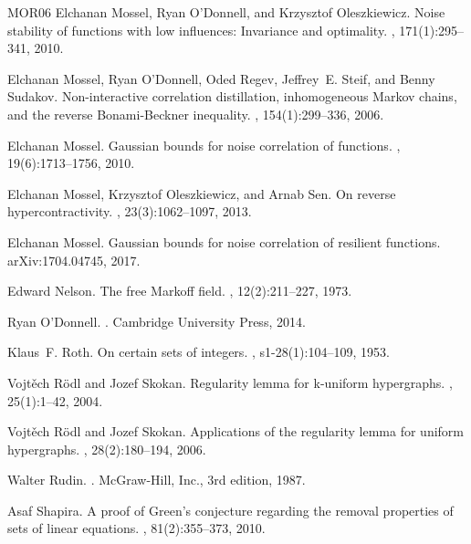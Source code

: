 \documentclass{daj}
\newcommand{\1}{\mathbbm{1}}
\theoremstyle{plain}
\theoremstyle{definition}
\begin{document}
\begin{thebibliography}{MOR{\etalchar{+}}06}
Elchanan Mossel, Ryan O'Donnell, and Krzysztof Oleszkiewicz.
\newblock Noise stability of functions with low influences: Invariance and
  optimality.
, 171(1):295--341, 2010.

Elchanan Mossel, Ryan O'Donnell, Oded Regev, Jeffrey~E. Steif, and Benny
  Sudakov.
\newblock Non-interactive correlation distillation, inhomogeneous {M}arkov
  chains, and the reverse {B}onami-{B}eckner inequality.
, 154(1):299--336, 2006.

Elchanan Mossel.
\newblock Gaussian bounds for noise correlation of functions.
, 19(6):1713--1756, 2010.

Elchanan Mossel, Krzysztof Oleszkiewicz, and Arnab Sen.
\newblock On reverse hypercontractivity.
, 23(3):1062--1097, 2013.

Elchanan Mossel.
\newblock Gaussian bounds for noise correlation of resilient functions.
\newblock arXiv:1704.04745, 2017.

Edward Nelson.
\newblock The free {M}arkoff field.
, 12(2):211--227, 1973.

Ryan {O'Donnell}.
.
\newblock Cambridge University Press, 2014.

Klaus~F. Roth.
\newblock On certain sets of integers.
, s1-28(1):104--109,
  1953.

Vojtěch Rödl and Jozef Skokan.
\newblock Regularity lemma for k-uniform hypergraphs.
, 25(1):1--42, 2004.

Vojtěch Rödl and Jozef Skokan.
\newblock Applications of the regularity lemma for uniform hypergraphs.
, 28(2):180--194, 2006.

Walter Rudin.
.
\newblock McGraw-Hill, Inc., 3rd edition, 1987.

Asaf Shapira.
\newblock A proof of {G}reen's conjecture regarding the removal properties of
  sets of linear equations.
, 81(2):355--373,
  2010.


\end{thebibliography}
\end{document}
